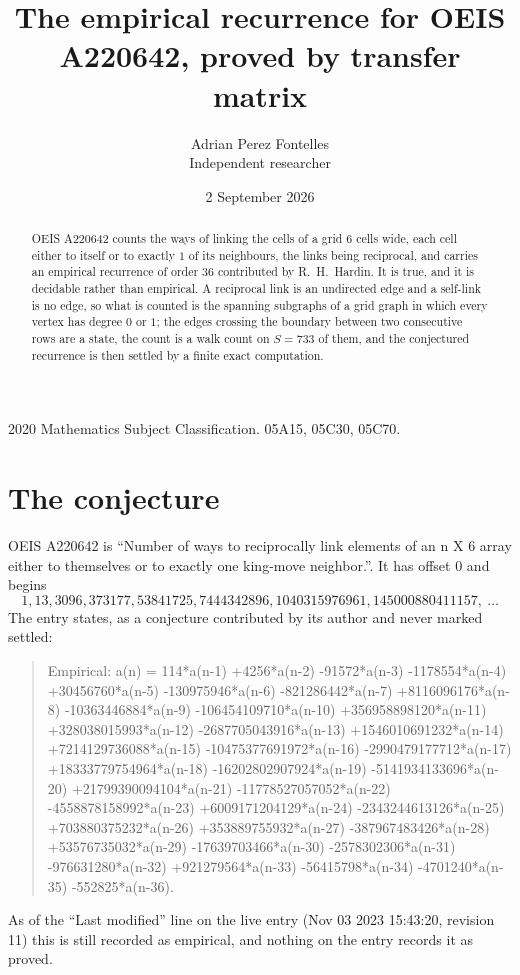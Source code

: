 \documentclass[11pt,a4paper]{article}
\title{The empirical recurrence for OEIS A220642, proved by transfer matrix}
\author{Adrian Perez Fontelles\\ \small Independent researcher}
\date{2 September 2026}
\theoremstyle{plain}
\theoremstyle{definition}
\begin{document}
\maketitle

\begin{abstract}
OEIS A220642 counts the ways of linking the cells of a grid $6$ cells wide, each cell either to
itself or to exactly $1$ of its neighbours, the links being reciprocal, and carries an
empirical recurrence of order $36$ contributed by R.~H.~Hardin. It is true, and it is
decidable rather than empirical. A reciprocal link is an undirected edge and a self-link is
no edge, so what is counted is the spanning subgraphs of a grid graph in which every vertex
has degree $0$ or $1$; the edges crossing the boundary between two consecutive rows are a
state, the count is a walk count on $S=733$ of them, and the conjectured recurrence is then
settled by a finite exact computation.
\end{abstract}

\noindent\small 2020 Mathematics Subject Classification. 05A15, 05C30, 05C70.\normalsize

\section{The conjecture}

OEIS A220642 is ``Number of ways to reciprocally link elements of an n X 6 array either to themselves or to exactly one king-move neighbor.''. It has offset $0$ and begins
\[
1, 13, 3096, 373177, 53841725, 7444342896, 1040315976961, 145000880411157,\ \dots
\]
The entry states, as a conjecture contributed by its author and never marked settled:
\begin{quote}
Empirical: a(n) = 114*a(n-1) +4256*a(n-2) -91572*a(n-3) -1178554*a(n-4) +30456760*a(n-5) -130975946*a(n-6) -821286442*a(n-7) +8116096176*a(n-8) -10363446884*a(n-9) -106454109710*a(n-10) +356958898120*a(n-11) +328038015993*a(n-12) -2687705043916*a(n-13) +1546010691232*a(n-14) +7214129736088*a(n-15) -10475377691972*a(n-16) -2990479177712*a(n-17) +18333779754964*a(n-18) -16202802907924*a(n-19) -5141934133696*a(n-20) +21799390094104*a(n-21) -11778527057052*a(n-22) -4558878158992*a(n-23) +6009171204129*a(n-24) -2343244613126*a(n-25) +703880375232*a(n-26) +353889755932*a(n-27) -387967483426*a(n-28) +53576735032*a(n-29) -17639703466*a(n-30) -2578302306*a(n-31) -976631280*a(n-32) +921279564*a(n-33) -56415798*a(n-34) -4701240*a(n-35) -552825*a(n-36).
\end{quote}
As of the ``Last modified'' line on the live entry (Nov 03 2023 15:43:20, revision 11) this is still
recorded as empirical, and nothing on the entry records it as proved.
\end{document}
